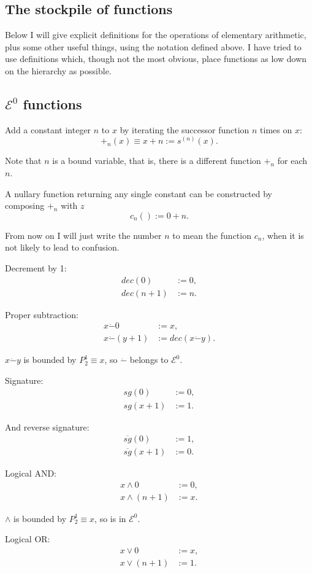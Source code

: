 \documentclass[a4paper]{article}
\newcommand{\grz}[1]{$\mathcal{E}^{#1}$}	%
\newcommand{\psub}{\dot -}	%
\newcommand{\rsg}{\overline{sg}} %
\newcommand{\recur}[1]{\begin{equation} \begin{split} #1 \end{split} \end{equation}}	%
\theoremstyle{plain}
\theoremstyle{definition}
\begin{document}
\subsection{The stockpile of functions}
Below I will give explicit definitions for the operations of elementary arithmetic, plus some other useful things, using the notation defined above. I have tried to use definitions which, though not the most obvious, place functions as low down on the hierarchy as possible.

\subsection{\grz{0} functions}
Add a constant integer $n$ to $x$ by iterating the successor function $n$ times on $x$:
\begin{equation} +_n(x) \equiv x + n := s^{(n)}(x). \end{equation}

Note that $n$ is a bound variable, that is, there is a different function $+_n$ for each $n$.

A nullary function returning any single constant can be constructed by composing $+_n$ with $z$
\begin{equation} c_n() := 0 + n. \end{equation}

From now on I will just write the number $n$ to mean the function $c_n$, when it is not likely to lead to confusion.

Decrement by 1:
\recur{
	dec(0) &:= 0, \\
	dec(n+1) &:= n.
}

Proper subtraction:
\recur{
	x \psub 0 &:= x, \\
	x \psub (y+1) &:= dec(x \psub y).
}

$x \psub y$ is bounded by $P_2^1 \equiv x$, so $\psub$ belongs to \grz{0}.

Signature:
\recur{
	sg(0) &:= 0, 	\\
	sg(x+1) &:= 1.
}

And reverse signature:
\recur{
	\rsg(0) &:= 1, \\
	\rsg(x+1) &:= 0.
}

Logical AND:
\recur{
	x \wedge 0 &:= 0,	 \\
	x \wedge (n+1) &:= x.
}

$\wedge$ is bounded by $P_2^1 \equiv x$, so is in \grz{0}.

Logical OR:
\recur{
	x \vee 0 &:= x, 		\\
	x \vee (n+1) &:= 1.
}
\end{document}
